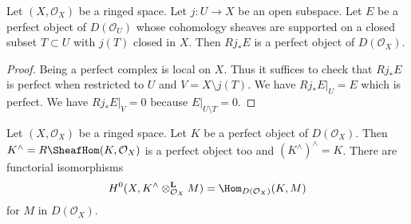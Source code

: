 \begin{lemma}
\label{lemma-pushforward-perfect}
Let $(X, \mathcal{O}_X)$ be a ringed space. Let $j : U \to X$ be an
open subspace. Let $E$ be a perfect object of $D(\mathcal{O}_U)$
whose cohomology
sheaves are supported on a closed subset $T \subset U$ with $j(T)$
closed in $X$. Then $Rj_*E$ is a perfect object of $D(\mathcal{O}_X)$.
\end{lemma}

\begin{proof}
Being a perfect complex is local on $X$. Thus it suffices to check that
$Rj_*E$ is perfect when restricted to $U$ and $V = X \setminus j(T)$.
We have $Rj_*E|_U = E$ which is perfect. We have
 $Rj_*E|_V = 0$ because $E|_{U \setminus T} = 0$.
\end{proof}

\begin{lemma}
\label{lemma-dual-perfect-complex}
Let $(X, \mathcal{O}_X)$ be a ringed space. Let $K$ be a perfect object of
$D(\mathcal{O}_X)$. Then $K^\wedge = R\SheafHom(K, \mathcal{O}_X)$ is a
perfect object too and $(K^\wedge)^\wedge = K$. There are
functorial isomorphisms
$$
H^0(X, K^\wedge \otimes_{\mathcal{O}_X}^\mathbf{L} M) =
\Hom_{D(\mathcal{O}_X)}(K, M)
$$
for $M$ in $D(\mathcal{O}_X)$.
\end{lemma}

